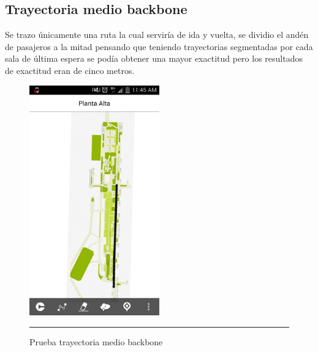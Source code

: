 \subsection{Trayectoria medio backbone}
Se trazo únicamente una ruta la cual serviría de ida y vuelta, se dividio el andén de pasajeros a la mitad pensando que teniendo 
trayectorias segmentadas por cada sala de última espera se podía obtener una mayor exactitud pero los resultados de exactitud eran de cinco 
metros.
\begin{figure}[h]
	\centering
		\includegraphics[width=0.5\textwidth]{Figuras/medioback.png}
		\rule{30em}{0.5pt}
	\caption[Prueba trayectoria medio backbone]{Prueba trayectoria medio backbone}
	\label{fig:vistaPruebaMedioBack}
\end{figure}
\clearpage

